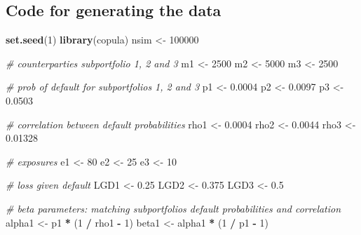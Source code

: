 \documentclass[
]{article}
\newenvironment{Shaded}{\begin{snugshade}}{\end{snugshade}}
\newcommand{\CommentTok}[1]{\textcolor[rgb]{0.56,0.35,0.01}{\textit{#1}}}
\newcommand{\DecValTok}[1]{\textcolor[rgb]{0.00,0.00,0.81}{#1}}
\newcommand{\FloatTok}[1]{\textcolor[rgb]{0.00,0.00,0.81}{#1}}
\newcommand{\KeywordTok}[1]{\textcolor[rgb]{0.13,0.29,0.53}{\textbf{#1}}}
\newcommand{\NormalTok}[1]{#1}
\newcommand{\OperatorTok}[1]{\textcolor[rgb]{0.81,0.36,0.00}{\textbf{#1}}}
\newcommand{\StringTok}[1]{\textcolor[rgb]{0.31,0.60,0.02}{#1}}
\begin{document}
\hypertarget{code-for-generating-the-data}{%
\subsection{Code for generating the data}\label{code-for-generating-the-data}}

\begin{Shaded}
\begin{Highlighting}[]
  \KeywordTok{set.seed}\NormalTok{(}\DecValTok{1}\NormalTok{)}
  \KeywordTok{library}\NormalTok{(copula)}
\NormalTok{  nsim \textless{}{-}}\StringTok{ }\DecValTok{100000}
  
\CommentTok{\# counterparties subportfolio 1, 2 and 3}
\NormalTok{  m1 \textless{}{-}}\StringTok{ }\DecValTok{2500}
\NormalTok{  m2 \textless{}{-}}\StringTok{ }\DecValTok{5000}
\NormalTok{  m3 \textless{}{-}}\StringTok{ }\DecValTok{2500}
  
  \CommentTok{\# prob of default for subportfolios 1, 2 and 3}
\NormalTok{  p1 \textless{}{-}}\StringTok{ }\FloatTok{0.0004} 
\NormalTok{  p2 \textless{}{-}}\StringTok{ }\FloatTok{0.0097} 
\NormalTok{  p3 \textless{}{-}}\StringTok{ }\FloatTok{0.0503}  
  
  \CommentTok{\# correlation between default probabilities}
\NormalTok{  rho1 \textless{}{-}}\StringTok{ }\FloatTok{0.0004}
\NormalTok{  rho2 \textless{}{-}}\StringTok{ }\FloatTok{0.0044}
\NormalTok{  rho3 \textless{}{-}}\StringTok{ }\FloatTok{0.01328}
  
\CommentTok{\# exposures}
\NormalTok{  e1 \textless{}{-}}\StringTok{ }\DecValTok{80}
\NormalTok{  e2 \textless{}{-}}\StringTok{ }\DecValTok{25} 
\NormalTok{  e3 \textless{}{-}}\StringTok{ }\DecValTok{10} 
  
\CommentTok{\# loss given default}
\NormalTok{  LGD1 \textless{}{-}}\StringTok{ }\FloatTok{0.25}
\NormalTok{  LGD2 \textless{}{-}}\StringTok{ }\FloatTok{0.375}
\NormalTok{  LGD3 \textless{}{-}}\StringTok{ }\FloatTok{0.5}
  
\CommentTok{\# beta parameters: matching subportfolios default probabilities and correlation}
\NormalTok{  alpha1 \textless{}{-}}\StringTok{ }\NormalTok{p1 }\OperatorTok{*}\StringTok{ }\NormalTok{(}\DecValTok{1} \OperatorTok{/}\StringTok{ }\NormalTok{rho1 }\OperatorTok{{-}}\StringTok{ }\DecValTok{1}\NormalTok{)}
\NormalTok{  beta1 \textless{}{-}}\StringTok{ }\NormalTok{alpha1 }\OperatorTok{*}\StringTok{ }\NormalTok{(}\DecValTok{1} \OperatorTok{/}\StringTok{ }\NormalTok{p1 }\OperatorTok{{-}}\StringTok{ }\DecValTok{1}\NormalTok{)}
  

\end{Highlighting}
\end{Shaded}
\end{document}
